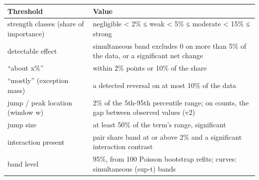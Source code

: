 \begin{tabular}{p{4.2cm}p{10.8cm}}
\toprule
\textbf{Threshold} & \textbf{Value} \\
\midrule
strength classes (share of importance) & negligible < 2\% ≤ weak < 5\% ≤ moderate < 15\% ≤ strong \\
detectable effect & simultaneous band excludes 0 on more than 5\% of the data, or a significant net change \\
“about x\%” & within 2\% points or 10\% of the share \\
“mostly” (exception mass) & a detected reversal on at most 10\% of the data \\
jump / peak location (window w) & 2\% of the 5th-95th percentile range; on counts, the gap between observed values (v2) \\
jump size & at least 50\% of the term's range, significant \\
interaction present & pair share band at or above 2\% and a significant interaction contrast \\
band level & 95\%, from 100 Poisson bootstrap refits; curves: simultaneous (sup-t) bands \\
\bottomrule
\end{tabular}
